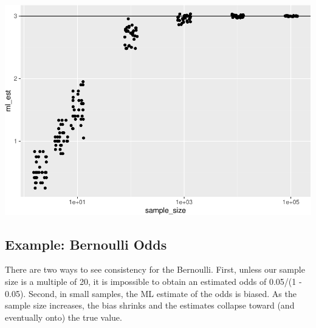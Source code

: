 \documentclass[
]{book}
\begin{document}
\includegraphics{01-04-bias-and-consistency_files/figure-latex/unnamed-chunk-7-1.pdf}

\hypertarget{example-bernoulli-odds-1}{%
\subsection{Example: Bernoulli Odds}\label{example-bernoulli-odds-1}}

There are two ways to see consistency for the Bernoulli. First, unless
our sample size is a multiple of 20, it is impossible to obtain an
estimated odds of 0.05/(1 - 0.05). Second, in small samples, the ML
estimate of the odds is biased. As the sample size increases, the bias
shrinks and the estimates collapse toward (and eventually onto) the true
value.
\end{document}
